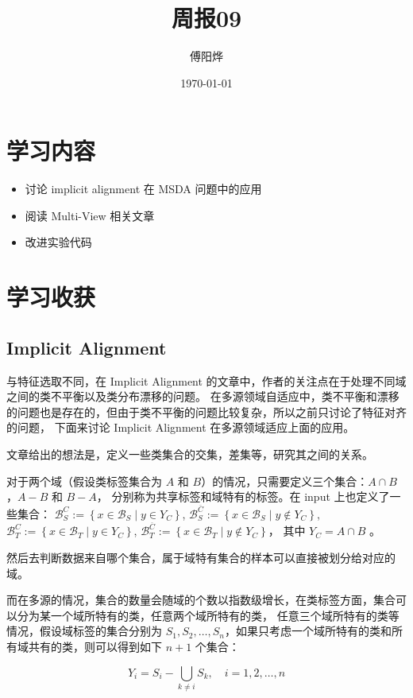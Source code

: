 \documentclass[UTF8]{ctexart}
\title{周报09}
\author{傅阳烨}
\date{\today}
\begin{document}
\maketitle
\section{学习内容}
\begin{itemize}
    \item 讨论 implicit alignment 在 MSDA 问题中的应用
    \item 阅读 Multi-View 相关文章
    \item 改进实验代码
\end{itemize}

\section{学习收获}
\subsection{Implicit Alignment}

与特征选取不同，在 Implicit Alignment 的文章中，作者的关注点在于处理不同域之间的类不平衡以及类分布漂移的问题。
在多源领域自适应中，类不平衡和漂移的问题也是存在的，但由于类不平衡的问题比较复杂，所以之前只讨论了特征对齐的问题，
下面来讨论 Implicit Alignment 在多源领域适应上面的应用。

文章给出的想法是，定义一些类集合的交集，差集等，研究其之间的关系。

对于两个域（假设类标签集合为 $A$ 和 $B$）的情况，只需要定义三个集合：$A \cap B$，$A - B$ 和 $B - A$，
分别称为共享标签和域特有的标签。在 input 上也定义了一些集合：
$\mathcal{B}_S^C:=\left \{ x\in \mathcal{B}_S \mid y\in Y_C \right \}$, $\mathcal{B}^{\overline{C}}_{S}:=\left \{ x\in \mathcal{B}_S \mid y\notin Y_C \right \}$, $\mathcal{B}_T^C:=\left \{ x\in \mathcal{B}_T \mid y\in Y_C \right \}$, $\mathcal{B}^{\overline{C}}_{T}:=\left \{ x\in \mathcal{B}_T \mid y\notin Y_C \right \}$，
其中 $Y_C = A \cap B$ 。

然后去判断数据来自哪个集合，属于域特有集合的样本可以直接被划分给对应的域。

而在多源的情况，集合的数量会随域的个数以指数级增长，在类标签方面，集合可以分为某一个域所特有的类，任意两个域所特有的类，
任意三个域所特有的类等情况，假设域标签的集合分别为 $S_1, S_2, \dots, S_n$，如果只考虑一个域所特有的类和所有域共有的类，则可以得到如下 $n+1$ 个集合：

$$
Y_i = S_i - \bigcup_{k \neq i}S_k,\quad i = 1, 2, \dots, n
$$
\end{document}
